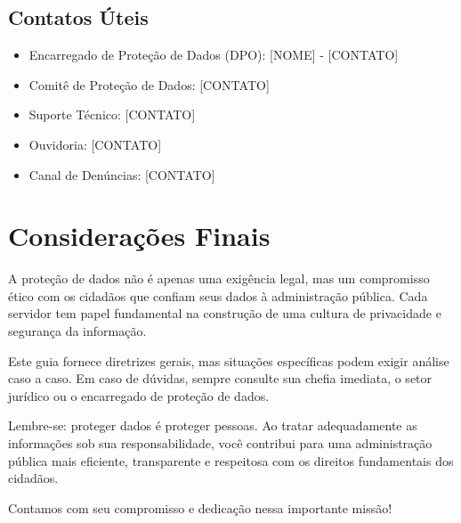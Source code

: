 \documentclass[12pt,a4paper]{article}
\begin{document}
\subsection{Contatos Úteis}
\begin{itemize}
    \item Encarregado de Proteção de Dados (DPO): [NOME] - [CONTATO]
    \item Comitê de Proteção de Dados: [CONTATO]
    \item Suporte Técnico: [CONTATO]
    \item Ouvidoria: [CONTATO]
    \item Canal de Denúncias: [CONTATO]
\end{itemize}

\section{Considerações Finais}

A proteção de dados não é apenas uma exigência legal, mas um compromisso ético com os cidadãos que confiam seus dados à administração pública. Cada servidor tem papel fundamental na construção de uma cultura de privacidade e segurança da informação.

Este guia fornece diretrizes gerais, mas situações específicas podem exigir análise caso a caso. Em caso de dúvidas, sempre consulte sua chefia imediata, o setor jurídico ou o encarregado de proteção de dados.

Lembre-se: proteger dados é proteger pessoas. Ao tratar adequadamente as informações sob sua responsabilidade, você contribui para uma administração pública mais eficiente, transparente e respeitosa com os direitos fundamentais dos cidadãos.

Contamos com seu compromisso e dedicação nessa importante missão!
\end{document}
